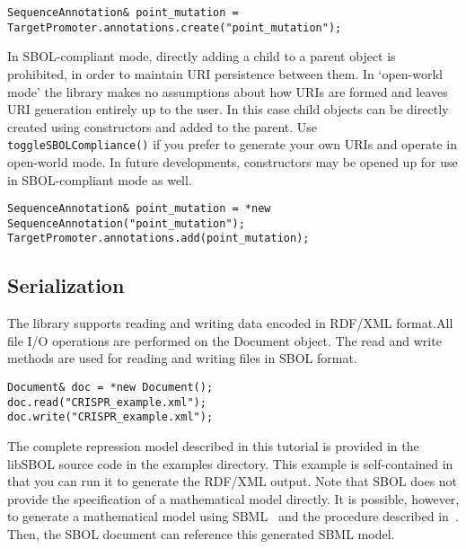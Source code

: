\vspace{\abovedisplayskip}
\begin{minipage}{0.95\textwidth} 
\begin{lstlisting}
SequenceAnnotation& point_mutation = TargetPromoter.annotations.create("point_mutation");
\end{lstlisting}
\end{minipage}

In SBOL-compliant mode, directly adding a child to a parent object is prohibited, in order to maintain URI persistence between them. In `open-world mode' the library makes no assumptions about how URIs are formed and leaves URI generation entirely up to the user.  In this case child objects can be directly created using constructors and added to the parent. Use \lstinline+toggleSBOLCompliance()+ if you prefer to generate your own URIs and operate in open-world mode. In future developments, constructors may be opened up for use in SBOL-compliant mode as well.

\vspace{\abovedisplayskip}
\begin{minipage}{0.95\textwidth} 
\begin{lstlisting}
SequenceAnnotation& point_mutation = *new SequenceAnnotation("point_mutation");
TargetPromoter.annotations.add(point_mutation);
\end{lstlisting}
\end{minipage}

\subsection*{Serialization}
The library supports reading and writing data encoded in RDF/XML format.All file I/O operations are performed on the Document object. The read and write methods are used for reading and writing files in SBOL format.

\vspace{\abovedisplayskip}
\begin{minipage}{0.95\textwidth} 
\begin{lstlisting}
Document& doc = *new Document();
doc.read("CRISPR_example.xml");
doc.write("CRISPR_example.xml");
\end{lstlisting}
\end{minipage}

The complete repression model described in this tutorial is provided in the libSBOL source code in the examples directory. This example is self-contained in that you can run it to generate the RDF/XML output. Note that SBOL does not provide the specification of a mathematical model directly. It is possible, however, to generate a mathematical model using SBML~\cite{SBML} and the procedure described in~\cite{roehner2015generating}. Then, the SBOL document can reference this generated SBML model.

